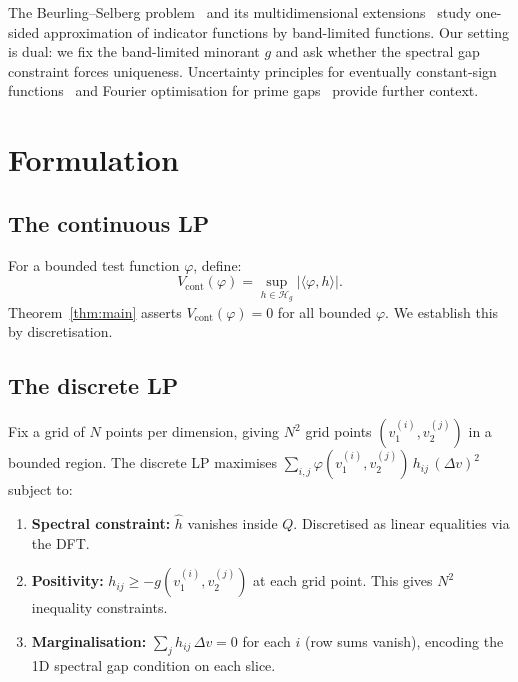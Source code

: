 \documentclass[11pt]{article}
\begin{document}
The Beurling--Selberg problem~\cite{Vaaler1985, HoltVaaler1996} and
its multidimensional extensions~\cite{CarneiroLittmann2015} study
one-sided approximation of indicator functions by band-limited
functions. Our setting is dual: we fix the band-limited minorant $g$
and ask whether the spectral gap constraint forces uniqueness.
Uncertainty principles for eventually constant-sign
functions~\cite{GorbachevIvanovTikhonov2019} and Fourier
optimisation for prime gaps~\cite{CarneiroMilinovichSoundarajan2019}
provide further context.


\section{Formulation}

\subsection{The continuous LP}

For a bounded test function $\varphi$, define:
\begin{equation}
V_{\mathrm{cont}}(\varphi) = \sup_{h \in \mathcal{H}_g}
\bigl| \langle \varphi, h \rangle \bigr|.
\label{eq:Vcont}
\end{equation}
Theorem~\ref{thm:main} asserts $V_{\mathrm{cont}}(\varphi) = 0$ for
all bounded $\varphi$. We establish this by discretisation.

\subsection{The discrete LP}

Fix a grid of $N$ points per dimension, giving $N^2$ grid points
$(v_1^{(i)}, v_2^{(j)})$ in a bounded region. The discrete LP maximises
$\sum_{i,j} \varphi(v_1^{(i)}, v_2^{(j)})\, h_{ij}\, (\Delta v)^2$
subject to:
\begin{enumerate}
\item \textbf{Spectral constraint:} $\hat{h}$ vanishes inside $Q$.
Discretised as linear equalities via the DFT.
\item \textbf{Positivity:} $h_{ij} \geq -g(v_1^{(i)}, v_2^{(j)})$
at each grid point. This gives $N^2$ inequality constraints.
\item \textbf{Marginalisation:} $\sum_j h_{ij}\, \Delta v = 0$ for
each $i$ (row sums vanish), encoding the 1D spectral gap condition
on each slice.
\end{enumerate}
\end{document}
